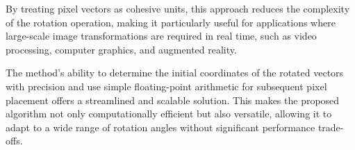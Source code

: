 \documentclass[conference]{IEEEtran}
\begin{document}
By treating pixel vectors as cohesive units, this approach reduces the complexity of the rotation operation, making it particularly useful for applications where large-scale image transformations are required in real time, such as video processing, computer graphics, and augmented reality. 

The method's ability to determine the initial coordinates of the rotated vectors with precision and use simple floating-point arithmetic for subsequent pixel placement offers a streamlined and scalable solution. This makes the proposed algorithm not only computationally efficient but also versatile, allowing it to adapt to a wide range of rotation angles without significant performance trade-offs.





\end{document}
